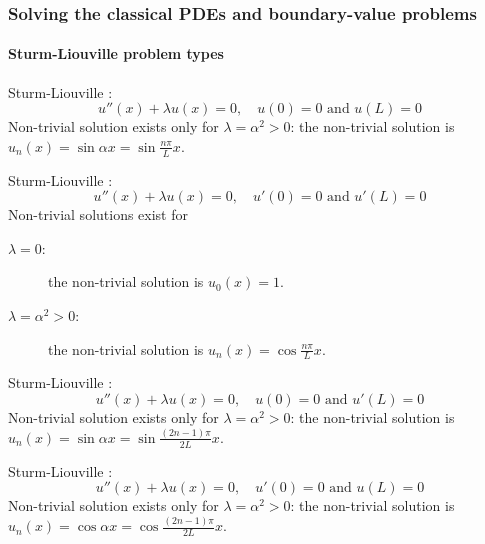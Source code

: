 \documentclass[10pt, twocolumn]{article}
\begin{document}
\subsubsection{Solving the classical PDEs and boundary-value problems}
\paragraph{Sturm-Liouville problem types}
Sturm-Liouville :
\[
  u''(x) + \lambda u(x) = 0, \quad u(0) = 0 \text{ and } u(L) = 0
\]
Non-trivial solution exists only for \(\lambda = \alpha^2 > 0\): the non-trivial solution is \(u_n(x) = \sin\alpha x = \sin\frac{n \pi}{L}x\).

Sturm-Liouville :
\[
  u''(x) + \lambda u(x) = 0, \quad u'(0) = 0 \text{ and } u'(L) = 0
\]
Non-trivial solutions exist for
\begin{description}
  \item[\(\lambda = 0\):] the non-trivial solution is \(u_0(x) = 1\).
  \item[\(\lambda = \alpha^2 > 0\):] the non-trivial solution is \(u_n(x) = \cos\frac{n \pi}{L}x\).
\end{description}

Sturm-Liouville :
\[
  u''(x) + \lambda u(x) = 0, \quad u(0) = 0 \text{ and } u'(L) = 0
\]
Non-trivial solution exists only for \(\lambda = \alpha^2 > 0\): the non-trivial solution is \(u_n(x) = \sin\alpha x = \sin\frac{(2n - 1) \pi}{2L}x\).

Sturm-Liouville :
\[
  u''(x) + \lambda u(x) = 0, \quad u'(0) = 0 \text{ and } u(L) = 0
\]
Non-trivial solution exists only for \(\lambda = \alpha^2 > 0\): the non-trivial solution is \(u_n(x) = \cos\alpha x = \cos\frac{(2n - 1) \pi}{2L}x\).
\end{document}
